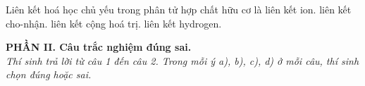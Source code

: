 \documentclass[11pt,a4paper]{article}
\begin{document}
\begin{ex}
Liên kết hoá học chủ yếu trong phân tử hợp chất hữu cơ là
\choice
{liên kết ion.}
{liên kết cho-nhận.}
{\True liên kết cộng hoá trị.}
{liên kết hydrogen.}

\end{ex}
\vspace{4pt}
\noindent
{\color{mainGreen}\textbf{\large PHẦN II. Câu trắc nghiệm đúng sai.}}\\
\textit{\small Thí sinh trả lời từ câu 1 đến câu 2. Trong mỗi ý a), b), c), d) ở mỗi câu, thí sinh chọn đúng hoặc sai.}
\vspace{2pt}
\end{document}

